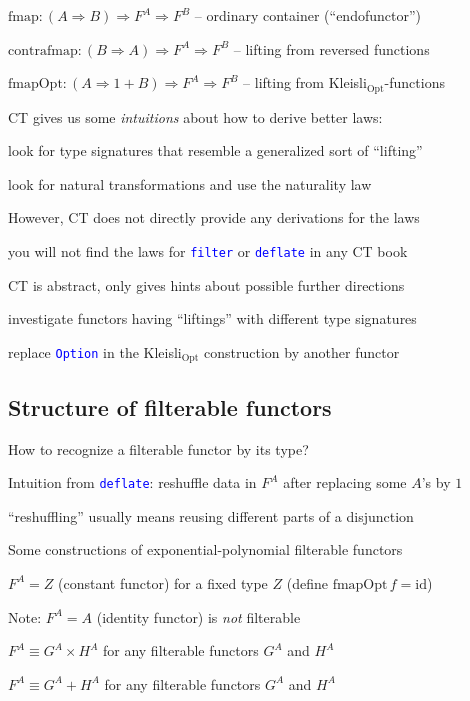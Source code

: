$\text{fmap}:\left(A\Rightarrow B\right)\Rightarrow F^{A}\Rightarrow F^{B}$
– ordinary container (``endofunctor'')

$\text{contrafmap}:\left(B\Rightarrow A\right)\Rightarrow F^{A}\Rightarrow F^{B}$
– lifting from reversed functions

$\text{fmapOpt}:\left(A\Rightarrow1+B\right)\Rightarrow F^{A}\Rightarrow F^{B}$
– lifting from Kleisli$_{\text{Opt}}$-functions 

CT gives us some \emph{intuitions} about how to derive better laws:

look for type signatures that resemble a generalized sort of ``lifting''

look for natural transformations and use the naturality law

However, CT does not directly provide any derivations for the laws

you will not find the laws for \texttt{\textcolor{blue}{\footnotesize{}filter}}
or \texttt{\textcolor{blue}{\footnotesize{}deflate}} in any CT book

CT is abstract, only gives hints about possible further directions

investigate functors having ``liftings'' with different type signatures

replace \texttt{\textcolor{blue}{\footnotesize{}Option}} in the Kleisli$_{\text{Opt}}$
construction by another functor


\subsection{Structure of filterable functors}

How to recognize a filterable functor by its type?

Intuition from \texttt{\textcolor{blue}{\footnotesize{}deflate}}:
reshuffle data in $F^{A}$ after replacing some $A$'s by $1$

``reshuffling'' usually means reusing different parts of a disjunction

Some constructions of exponential-polynomial filterable functors 

$F^{A}=Z$ (constant functor) for a fixed type $Z$ (define $\text{fmapOpt}\,f=\text{id}$)

Note: $F^{A}=A$ (identity functor) is \emph{not} filterable

$F^{A}\equiv G^{A}\times H^{A}$ for any filterable functors $G^{A}$
and $H^{A}$

$F^{A}\equiv G^{A}+H^{A}$ for any filterable functors $G^{A}$ and
$H^{A}$

